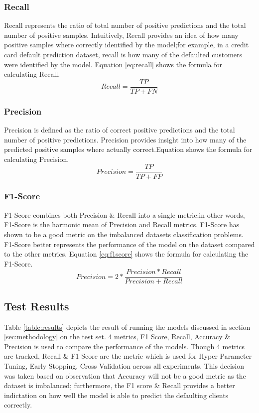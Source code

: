 \documentclass[twoside,11pt,a4paper]{article}
\begin{document}
\subsubsection{Recall}
Recall represents the ratio of total number of positive predictions and the total number of positive samples. Intuitively, Recall provides an idea of how many positive samples where correctly identified by the model;for example, in a credit card default prediction dataset, recall is how many of the defaulted customers were identified by the model. Equation \ref{eq:recall} shows the formula for calculating Recall.
\begin{equation}\label{eq:recall}
	Recall = \frac{TP}{TP+FN}
\end{equation}
\subsubsection{Precision}
Precision is defined as the ratio of correct positive predictions and the total number of positive predictions. Precision provides insight into how many of the predicted positive samples where actually correct.Equation \label{eq:precision} shows the formula for calculating Precision.
\begin{equation}\label{eq:precision}
	Precision = \frac{TP}{TP+FP}
\end{equation}

\subsubsection{F1-Score}
F1-Score combines both Precision \& Recall into a single metric;in other words, F1-Score is the harmonic mean of Precision and Recall metrics. F1-Score has shown to be a good metric on the imbalanced datasets classification problems. F1-Score better represents the performance of the model on the dataset compared to the other metrics. Equation \ref{eq:f1score} shows the formula for calculating the F1-Score.
\begin{equation}\label{eq:f1score}
	Precision = 2 * \frac{Precision*Recall}{Precision + Recall}
\end{equation}

\subsection{Test Results}
Table \ref{table:results} depicts the result of running the models discussed in section \ref{sec:methodology} on the test set. 4 metrics, F1 Score, Recall, Accuracy \& Precision is used to compare the performance of the models. Though 4 metrics are tracked, Recall \& F1 Score are the metric which is used for Hyper Parameter Tuning, Early Stopping, Cross Validation across all experiments. This decision was taken based on observation that Accuracy will not be a good metric as the dataset is imbalanced; furthermore, the F1 score \& Recall provides a better indictation on how well the model is able to predict the defaulting clients correctly.
\end{document}
